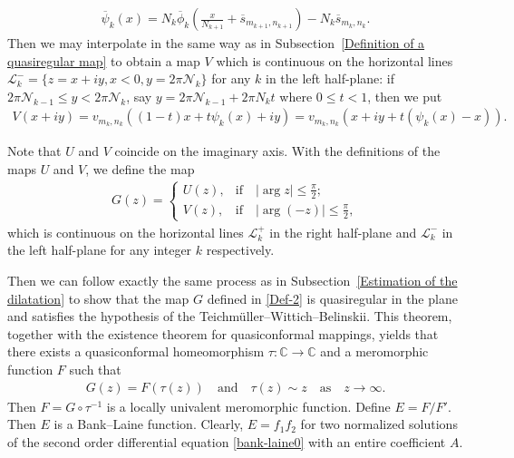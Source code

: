 \documentclass[12pt]{amsart}
\numberwithin{equation}{section}
\begin{document}
\begin{equation*}%
\begin{split}
\overline{\psi}_k(x)=N_k\overline{\phi}_k\left(\frac{x}{N_{k+1}}+\overline{s}_{m_{k+1},n_{k+1}}\right)-N_k\overline{s}_{m_{k},n_{k}}.
\end{split}
\end{equation*}
Then we may interpolate in the same way as in Subsection~\ref{Definition of a quasiregular map} to obtain a map $V$ which is continuous on the horizontal lines $\mathcal{L}^{-}_{k}=\{z=x+iy, x<0, y=2\pi\mathcal{N}_k\}$ for any $k$ in the left half-plane: if $2\pi \mathcal{N}_{k-1}\leq y<2\pi \mathcal{N}_k$, say $y=2\pi \mathcal{N}_{k-1}+2\pi N_kt$ where $0\leq t<1$, then we put
\begin{equation*}
\begin{split}
V(x+iy)=v_{m_{k},n_{k}}((1-t)x+t\psi_k(x)+iy)=v_{m_{k},n_{k}}(x+iy+t(\psi_k(x)-x)).
\end{split}
\end{equation*}

Note that $U$ and $V$ coincide on the imaginary axis. With the definitions of the maps $U$ and $V$, we define the map
\begin{equation}\label{Def-2}
\begin{split}
G(z)=\left\{
       \begin{array}{ll}
         U(z),   & \text{if} \quad |\arg z|\leq \frac{\pi}{2}; \\
         V(z),   & \text{if} \quad |\arg(-z)|\leq \frac{\pi}{2},
       \end{array}
      \right.
\end{split}
\end{equation}
which is continuous on the horizontal lines $\mathcal{L}^{+}_k$ in the right half-plane and $\mathcal{L}^{-}_{k}$ in the left half-plane for any integer $k$ respectively.

Then we can follow exactly the same process as in Subsection~\ref{Estimation of the dilatation} to show that the map $G$ defined in \eqref{Def-2} is quasiregular in the plane and satisfies the hypothesis of the Teichm\"uller--Wittich--Belinskii. This theorem, together with the existence theorem for quasiconformal mappings, yields that there exists a quasiconformal homeomorphism $\tau:\mathbb{C}\to\mathbb{C}$ and a meromorphic function $F$ such that
\begin{equation}\label{recuree1pm117 final-kjp-1}
\begin{split}
G(z)=F(\tau(z)) \quad  \text{and} \quad \tau(z)\sim z \quad \text{as} \quad z\to\infty.
\end{split}
\end{equation}
Then $F=G\circ \tau^{-1}$ is a locally univalent meromorphic function. Define $E=F/F'$. Then $E$ is a Bank--Laine function. Clearly, $E=f_1f_2$ for two normalized solutions of the second order differential equation \eqref{bank-laine0} with an entire coefficient $A$.
\end{document}

